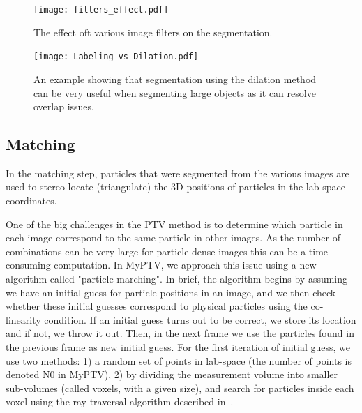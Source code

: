 \documentclass[10pt,a4paper]{article}
\begin{document}
\begin{figure}[h!]
	\centering
	\texttt{[image: filters\_effect.pdf]}
	\caption{The effect oft various image filters on the segmentation.\label{fig:image_filters}}
\end{figure}



\begin{figure}[h!]
	\centering
	\texttt{[image: Labeling\_vs\_Dilation.pdf]}
	\caption{An example showing that segmentation using the dilation method can be very useful when segmenting large objects as it can resolve overlap issues.\label{fig:Labeling_vs_Dilation}}
\end{figure}


















\subsection{Matching}\label{sec:workflow_match}

In the matching step, particles that were segmented from the various images are used to stereo-locate (triangulate) the 3D positions of particles in the lab-space coordinates. 



One of the big challenges in the PTV method is to determine which particle in each image correspond to the same particle in other images. As the number of combinations can be very large for particle dense images this can be a time consuming computation. In MyPTV, we approach this issue using a new algorithm called "particle marching". In brief, the algorithm begins by assuming we have an initial guess for particle positions in an image, and we then check whether these initial guesses correspond to physical particles using the co-linearity condition. If an initial guess turns out to be correct, we store its location and if not, we throw it out. Then, in the next frame we use the particles found in the previous frame as new initial guess. For the first iteration of initial guess, we use two methods: 1) a random set of points in lab-space (the number of points is denoted N0 in MyPTV), 2) by dividing the measurement volume into smaller sub-volumes (called voxels, with a given size), and search for particles inside each voxel using the ray-traversal algorithm described in~\cite{Bourgoin2020}.
     
\end{document}
